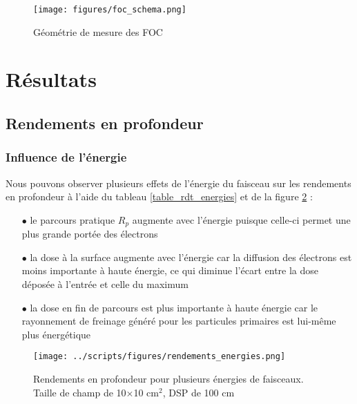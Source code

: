 \documentclass{article}
\begin{document}
\begin{figure}[h]
  \centering
  \texttt{[image: figures/foc\_schema.png]}
  \caption{Géométrie de mesure des FOC \cite{mayles2007handbook}}
  \label{fig_foc}
\end{figure}

\newpage
\section{Résultats}
\subsection{Rendements en profondeur}
\subsubsection{Influence de l'énergie}

Nous pouvons observer plusieurs effets de l'énergie du faisceau sur les rendements en profondeur à l'aide du tableau \ref*{table_rdt_energies} et de la figure \ref*{fig_rdt_energie} :

\begin{itemize}
  \item[$\bullet$] le parcours pratique $R_p$ augmente avec l'énergie puisque celle-ci permet une plus grande portée des électrons
  \item[$\bullet$] la dose à la surface augmente avec l'énergie car la diffusion des électrons est moins importante à haute énergie, ce qui diminue l'écart entre la dose déposée à l'entrée et celle du maximum
  \item[$\bullet$] la dose en fin de parcours est plus importante à haute énergie car le rayonnement de freinage généré pour les particules primaires est lui-même plus énergétique
\end{itemize}

\begin{figure}[h]
  \centering
  \texttt{[image: ../scripts/figures/rendements\_energies.png]}
  \caption{Rendements en profondeur pour plusieurs énergies de faisceaux. Taille de champ de 10$\times$10 cm$^2$, DSP de 100 cm}
  \label{fig_rdt_energie}
\end{figure}
\end{document}
